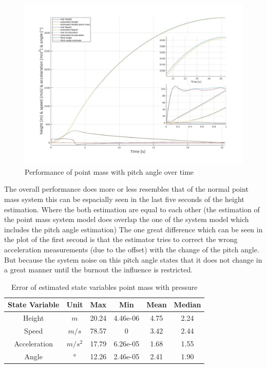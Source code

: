 \begin{figure}[h!]
 \centering
 \includegraphics[width=.8 \textwidth]{./Pictures/PointMassPitchAnglePerformance.jpg}
 \caption{Performance of point mass with pitch angle over time}
 \label{fig:PointMassPitchAnglePerformance}
\end{figure}

The overall performance does more or less resembles that of the normal point mass system this can be espacially seen in the last five seconds of the height estimation.
Where the both estimation are equal to each other (the estimation of the point mass system model does overlap the one of the system model which includes the pitch angle estimation)
The one great difference which can be seen in the plot of the first second is that the estimator tries to correct the wrong acceleration measurements (due to the offset) with the change of the pitch angle.
But because the system noise on this pitch angle states that it does not change in a great manner until the burnout the influence is restricted.

\begin{table}[h!]
\centering
\begin{tabular}{cccccc}
\hline
\multicolumn{1}{|c|}{State Variable} & \multicolumn{1}{c|}{Unit} & \multicolumn{1}{c|}{Max} & \multicolumn{1}{c|}{Min} & \multicolumn{1}{c|}{Mean} & \multicolumn{1}{c|}{Median} \\ \hline
Height                            & $m$                         & 20.24                  & 4.46e-06                 & 4.75                    & 2.24                      \\
Speed                             & $m/s$                       & 78.57                   & 0                        & 3.42                   & 2.44                      \\
Acceleration                      & $m/s^2$   			& 17.79                  & 6.26e-05                 & 1.68                    & 1.55                      \\
Angle	                  	  & $°$   			& 12.26                   & 2.46e-05                 & 2.41                  & 1.90                     
\end{tabular}
\caption{Error of estimated state variables point mass with pressure}
\label{tab:ErrorPointMassPitchAngle}
\end{table}

